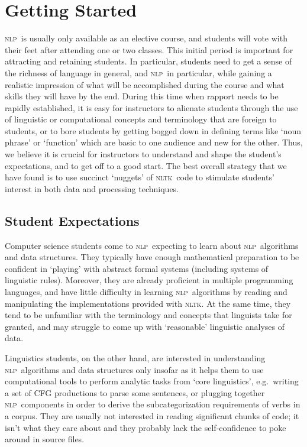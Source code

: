\documentclass[11pt]{article}
\newcommand{\NLP}{\textsc{nlp}}
\newcommand{\NLTK}{\textsc{nltk}}
\begin{document}
\section{Getting Started}
\label{sec:getting-started}

\NLP\ is usually only available as an elective course, and students
will vote with their feet after attending one or two classes.  This
initial period is important for attracting and retaining students.  In
particular, students need to get a sense of the richness of language
in general, and \NLP\ in particular, while gaining a realistic
impression of what will be accomplished during the course and what
skills they will have by the end.  During this time when rapport needs
to be rapidly established, it is easy for instructors to alienate
students through the use of linguistic or computational concepts and
terminology that are foreign to students, or to bore students by
getting bogged down in defining terms like `noun phrase' or `function'
which are basic to one audience and new for the other.  Thus, we
believe it is crucial for instructors to understand and shape the
student's expectations, and to get off to a good start.  The best
overall strategy that we have found is to use succinct `nuggets' of
\NLTK\ code to stimulate students' interest in both data and
processing techniques.

\subsection{Student Expectations}

Computer science students come to \NLP\ expecting to learn about \NLP\
algorithms and data structures.  They typically have enough
mathematical preparation to be confident in `playing' with abstract
formal systems (including systems of linguistic rules).  Moreover,
they are already proficient in multiple programming languages, and
have little difficulty in learning \NLP\ algorithms by reading and
manipulating the implementations provided with \NLTK. At the same
time, they tend to be unfamiliar with the terminology and concepts
that linguists take for granted, and may struggle to come up with
`reasonable' linguistic analyses of data.

Linguistics students, on the other hand, are interested in
understanding \NLP\ algorithms and data structures only insofar as it helps them
to use computational tools to perform analytic tasks from `core linguistics',
e.g.\ writing a set of CFG productions to parse some sentences, or
plugging together \NLP\ components in order to derive the subcategorization
requirements of verbs in a corpus.
They are usually not interested in reading significant chunks of code;
it isn't what they care about and they
probably lack the self-confidence to poke around in source files.
\end{document}
